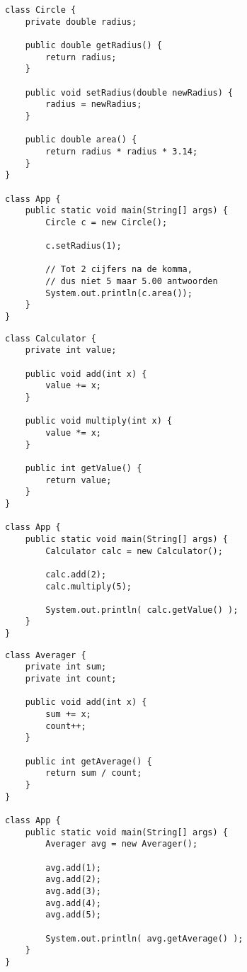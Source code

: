 \documentclass[a4paper]{article}
\begin{document}
\begin{lstlisting}
class Circle {
    private double radius;

    public double getRadius() {
        return radius;
    }

    public void setRadius(double newRadius) {
        radius = newRadius;
    }

    public double area() {
        return radius * radius * 3.14;
    }
}

class App {
    public static void main(String[] args) {
        Circle c = new Circle();
        
        c.setRadius(1);

        // Tot 2 cijfers na de komma,
        // dus niet 5 maar 5.00 antwoorden
        System.out.println(c.area());
    }
}
\end{lstlisting}\clearpage

\begin{lstlisting}
class Calculator {
    private int value;

    public void add(int x) {
        value += x;
    }

    public void multiply(int x) {
        value *= x;
    }

    public int getValue() {
        return value;
    }
}

class App {
    public static void main(String[] args) {
        Calculator calc = new Calculator();

        calc.add(2);
        calc.multiply(5);

        System.out.println( calc.getValue() );
    }
}
\end{lstlisting}\clearpage

\begin{lstlisting}
class Averager {
    private int sum;
    private int count;

    public void add(int x) {
        sum += x;
        count++;
    }

    public int getAverage() {
        return sum / count;
    }
}

class App {
    public static void main(String[] args) {
        Averager avg = new Averager();

        avg.add(1);
        avg.add(2);
        avg.add(3);
        avg.add(4);
        avg.add(5);

        System.out.println( avg.getAverage() );
    }
}
\end{lstlisting}\clearpage
\end{document}
